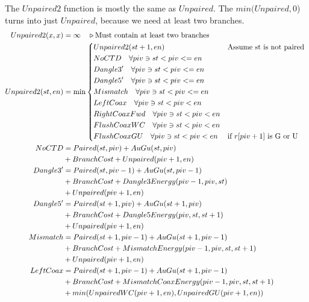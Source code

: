 \documentclass{cshonours}
\begin{document}
The $Unpaired2$ function is mostly the same as $Unpaired$. The $min(Unpaired, 0$) turns into just $Unpaired$, because we need at least two branches.
\begin{align*}
Unpaired2(x, x) &= \infty \quad \triangleright \text{Must contain at least two branches} \\
Unpaired2(st, en) &= \min{\begin{dcases*}
  Unpaired2(st + 1, en) & Assume st is not paired \\
  NoCTD \quad \forall piv \ni st < piv <= en \\
  Dangle3' \quad \forall piv \ni st < piv <= en \\
  Dangle5' \quad \forall piv \ni st < piv <= en \\
  Mismatch \quad \forall piv \ni st < piv <= en \\
  LeftCoax \quad \forall piv \ni st < piv < en \\
  RightCoaxFwd \quad \forall piv \ni st < piv < en \\
  FlushCoaxWC \quad \forall piv \ni st < piv < en \\
  FlushCoaxGU \quad \forall piv \ni st < piv < en & if $r[piv + 1]$ is G or U \\
\end{dcases*}} \\
NoCTD &= Paired(st, piv) + AuGu(st, piv) \\
  &+ BranchCost + Unpaired(piv + 1, en) \\
Dangle3' &= Paired(st, piv - 1) + AuGu(st, piv - 1) \\
  & + BranchCost + Dangle3Energy(piv - 1, piv, st) \\
  & + Unpaired(piv + 1, en) \\
Dangle5' &= Paired(st + 1, piv) + AuGu(st + 1, piv) \\
  & + BranchCost + Dangle5Energy(piv, st, st + 1) \\
  & + Unpaired(piv + 1, en) \\
Mismatch &= Paired(st + 1, piv - 1) + AuGu(st + 1, piv - 1) \\
  & + BranchCost + MismatchEnergy(piv - 1, piv, st, st + 1) \\
  & + Unpaired(piv + 1, en) \\
LeftCoax &= Paired(st + 1, piv - 1) + AuGu(st + 1, piv - 1) \\
  & + BranchCost + MismatchCoaxEnergy(piv - 1, piv, st, st + 1) \\
  & + min(UnpairedWC(piv + 1, en), UnpairedGU(piv + 1, en)) \\

\end{align*}
\end{document}
